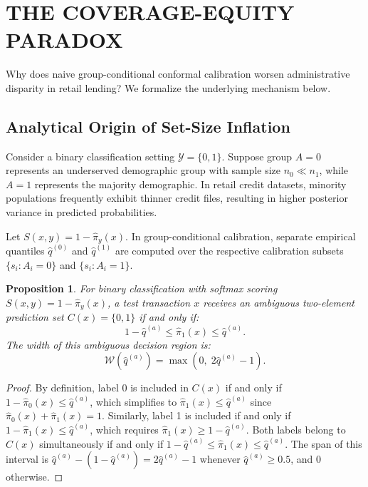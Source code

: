 \documentclass[twoside]{article}
\newtheorem{proposition}{Proposition}
\begin{document}
\section{THE COVERAGE-EQUITY PARADOX}
\label{sec:paradox}

Why does naive group-conditional conformal calibration worsen administrative disparity in retail lending? We formalize the underlying mechanism below.

\subsection{Analytical Origin of Set-Size Inflation}
Consider a binary classification setting $\mathcal{Y} = \{0, 1\}$. Suppose group $A=0$ represents an underserved demographic group with sample size $n_0 \ll n_1$, while $A=1$ represents the majority demographic. In retail credit datasets, minority populations frequently exhibit thinner credit files, resulting in higher posterior variance in predicted probabilities.

Let $S(x, y) = 1 - \hat{\pi}_y(x)$. In group-conditional calibration, separate empirical quantiles $\hat{q}^{(0)}$ and $\hat{q}^{(1)}$ are computed over the respective calibration subsets $\{s_i : A_i = 0\}$ and $\{s_i : A_i = 1\}$.

\begin{proposition}
\label{prop:set_size}
For binary classification with softmax scoring $S(x, y) = 1 - \hat{\pi}_y(x)$, a test transaction $x$ receives an ambiguous two-element prediction set $C(x) = \{0, 1\}$ if and only if:
\begin{equation}
1 - \hat{q}^{(a)} \le \hat{\pi}_1(x) \le \hat{q}^{(a)}.
\end{equation}
The width of this ambiguous decision region is:
\begin{equation}
\mathcal{W}\left(\hat{q}^{(a)}\right) = \max\left(0,\; 2\hat{q}^{(a)} - 1\right).
\end{equation}
\end{proposition}

\begin{proof}
By definition, label 0 is included in $C(x)$ if and only if $1 - \hat{\pi}_0(x) \le \hat{q}^{(a)}$, which simplifies to $\hat{\pi}_1(x) \le \hat{q}^{(a)}$ since $\hat{\pi}_0(x) + \hat{\pi}_1(x) = 1$. Similarly, label 1 is included if and only if $1 - \hat{\pi}_1(x) \le \hat{q}^{(a)}$, which requires $\hat{\pi}_1(x) \ge 1 - \hat{q}^{(a)}$. Both labels belong to $C(x)$ simultaneously if and only if $1 - \hat{q}^{(a)} \le \hat{\pi}_1(x) \le \hat{q}^{(a)}$. The span of this interval is $\hat{q}^{(a)} - (1 - \hat{q}^{(a)}) = 2\hat{q}^{(a)} - 1$ whenever $\hat{q}^{(a)} \ge 0.5$, and 0 otherwise.
\end{proof}
\end{document}
